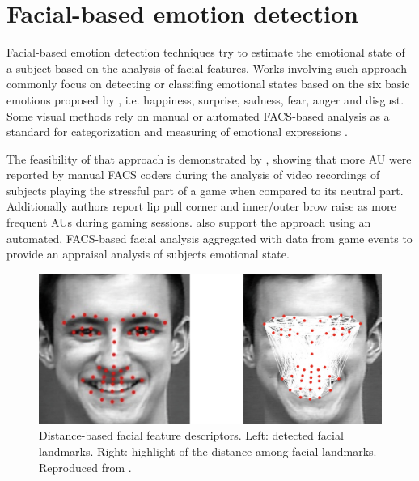 \section{Facial-based emotion detection}
\label{ch:literature-face-emotion-detection}

Facial-based emotion detection techniques try to estimate the emotional state of a subject based on the analysis of facial features. Works involving such approach commonly focus on detecting or classifing emotional states based on the six basic emotions proposed by \textcite{ekman1971constants}, i.e. happiness, surprise, sadness, fear, anger and disgust. Some visual methods rely on manual or automated FACS-based analysis as a standard for categorization and measuring of emotional expressions \parencite{bartlett1999measuring}.

The feasibility of that approach is demonstrated by \textcite{kaiser1994multi}, showing that more AU were reported by manual FACS coders during the analysis of video recordings of subjects playing the stressful part of a game when compared to its neutral part. Additionally authors report lip pull corner and inner/outer brow raise as more frequent AUs during gaming sessions. \textcite{wehrle2000emotion} also support the approach using an automated, FACS-based facial analysis aggregated with data from game events to provide an appraisal analysis of subjects emotional state.

\begin{figure}[h]
    \centering
    \includegraphics[width=1.0\linewidth]{Content/figures/samara2016sensing-distances.png}
    \caption{Distance-based facial feature descriptors. Left: detected facial landmarks. Right: highlight of the distance among facial landmarks. Reproduced from \textcite{samara2016sensing}.}
    \label{fig:distance-samara}
\end{figure}

